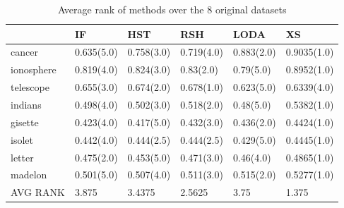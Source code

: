 
\begin{table}
	\centering
    \begin{tabular}{llllll}
    	\toprule
               & IF         & HST        & RSH        & LODA       & XS          \\	\hline
    cancer     & 0.635(5.0) & 0.758(3.0) & 0.719(4.0) & 0.883(2.0) & 0.9035(1.0) \\
    ionosphere & 0.819(4.0) & 0.824(3.0) & 0.83(2.0)  & 0.79(5.0)  & 0.8952(1.0) \\
    telescope  & 0.655(3.0) & 0.674(2.0) & 0.678(1.0) & 0.623(5.0) & 0.6339(4.0) \\
    indians    & 0.498(4.0) & 0.502(3.0) & 0.518(2.0) & 0.48(5.0)  & 0.5382(1.0) \\
    gisette    & 0.423(4.0) & 0.417(5.0) & 0.432(3.0) & 0.436(2.0) & 0.4424(1.0) \\
    isolet     & 0.442(4.0) & 0.444(2.5) & 0.444(2.5) & 0.429(5.0) & 0.4445(1.0) \\
    letter     & 0.475(2.0) & 0.453(5.0) & 0.471(3.0) & 0.46(4.0)  & 0.4865(1.0) \\
    madelon    & 0.501(5.0) & 0.507(4.0) & 0.511(3.0) & 0.515(2.0) & 0.5277(1.0) \\	\midrule
    AVG RANK   & 3.875      & 3.4375     & 2.5625     & 3.75       & 1.375       \\
    \bottomrule
    \end{tabular}
    \caption {Average rank of methods over the 8 original datasets}
            \label{table:OriginalRanks}

\end{table}




